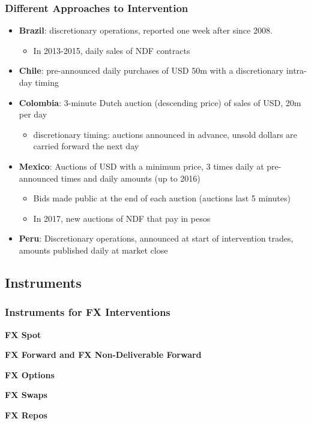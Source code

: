 \documentclass{beamer}
\newenvironment{wideitemize}{\itemize\addtolength{\itemsep}{10pt}}{\enditemize}
\begin{document}
\begin{frame}
  \frametitle{Different Approaches to Intervention}
  \begin{itemize}
  \item \textbf{Brazil}: discretionary operations, reported one week after since 2008.
    \begin{itemize}
    \item In 2013-2015, daily sales of NDF contracts
    \end{itemize}    
    \item \textbf{Chile}: pre-announced daily purchases of USD 50m with a discretionary intra-day timing
    \item \textbf{Colombia}: 3-minute Dutch auction (descending price) of sales of USD, 20m per day
      \begin{itemize}
      \item discretionary timing: auctions announced in advance, unsold dollars are carried forward the next day
      \end{itemize}      
    \item \textbf{Mexico}: Auctions of USD with a minimum price, 3 times daily at pre-announced times and daily amounts (up to 2016)
      \begin{itemize}
      \item Bids made public at the end of each auction (auctions last 5 minutes)
      \item In 2017, new auctions of NDF that pay in pesos
      \end{itemize}      
    \item \textbf{Peru}: Discretionary operations, announced at start of intervention trades, amounts published daily at market close
  \end{itemize}
\end{frame}

\subsection{Instruments}
\begin{frame}
  \frametitle{Instruments for FX Interventions}
  \begin{wideitemize}
    \item \textbf{FX Spot}
    \item \textbf{FX Forward and FX Non-Deliverable Forward}
    \item \textbf{FX Options} 
    \item \textbf{FX Swaps} 
    \item \textbf{FX Repos}
  \end{wideitemize}
\end{frame}
\end{document}

